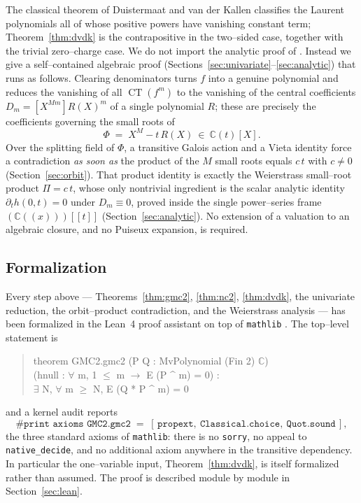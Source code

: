 \documentclass[11pt,reqno]{amsart}
\theoremstyle{plain}
\theoremstyle{definition}
\newcommand{\C}{\mathbb{C}}
\newcommand{\CT}{\operatorname{CT}}
\begin{document}
The classical theorem of Duistermaat and van der Kallen \cite{DvdK1998} classifies the Laurent
polynomials all of whose positive powers have vanishing constant term; Theorem~\ref{thm:dvdk} is the
contrapositive in the two--sided case, together with the trivial zero--charge case. We do not import
the analytic proof of \cite{DvdK1998}. Instead we give a self--contained algebraic proof
(Sections~\ref{sec:univariate}--\ref{sec:analytic}) that runs as follows. Clearing denominators turns
$f$ into a genuine polynomial and reduces the vanishing of all $\CT(f^m)$ to the vanishing of the
central coefficients $D_m=[X^{Mm}]R(X)^m$ of a single polynomial $R$; these are precisely the
coefficients governing the small roots of
\[
  \Phi \;=\; X^{M}-t\,R(X)\ \in\ \C(t)[X].
\]
Over the splitting field of $\Phi$, a transitive Galois action and a Vieta identity force a
contradiction \emph{as soon as} the product of the $M$ small roots equals $c\,t$ with $c\ne0$
(Section~\ref{sec:orbit}). That product identity is exactly the Weierstrass small--root product
$\Pi=c\,t$, whose only nontrivial ingredient is the scalar analytic identity
$\partial_t h(0,t)=0$ under $D_m\equiv 0$, proved inside the single power--series frame
$(\C(\!(x)\!))[\![t]\!]$ (Section~\ref{sec:analytic}). No extension of a valuation to an algebraic
closure, and no Puiseux expansion, is required.

\subsection{Formalization}
Every step above --- Theorems~\ref{thm:gmc2}, \ref{thm:nc2}, \ref{thm:dvdk}, the univariate reduction,
the orbit--product contradiction, and the Weierstrass analysis --- has been formalized in the Lean~4
proof assistant on top of \texttt{mathlib} \cite{mathlib}. The top--level statement is
\begin{quote}\ttfamily
theorem GMC2.gmc2 (P Q : MvPolynomial (Fin 2) $\C$)\\
\hspace*{2em}(hnull : $\forall$ m, 1 $\le$ m $\to$ E (P \^{} m) = 0) :\\
\hspace*{2em}$\exists$ N, $\forall$ m $\ge$ N, E (Q * P \^{} m) = 0
\end{quote}
and a kernel audit reports
\[
  \texttt{\#print axioms GMC2.gmc2} \;=\; [\,\mathtt{propext},\ \mathtt{Classical.choice},\ \mathtt{Quot.sound}\,],
\]
the three standard axioms of \texttt{mathlib}: there is no \texttt{sorry}, no appeal to
\texttt{native\_decide}, and no additional axiom anywhere in the transitive dependency. In particular
the one--variable input, Theorem~\ref{thm:dvdk}, is itself formalized rather than assumed. The proof
is described module by module in Section~\ref{sec:lean}.
\end{document}
